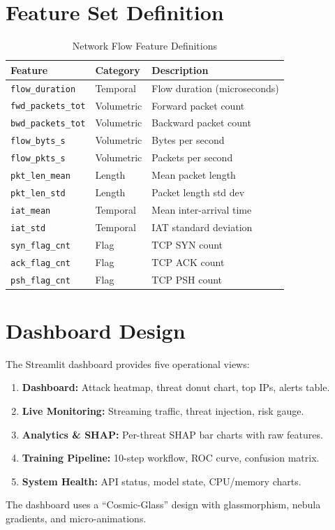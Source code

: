 \section{Feature Set Definition}

\begin{table}[H]
\centering
\caption{Network Flow Feature Definitions}
\label{tab:features}
\begin{tabular}{l l p{5.5cm}}
\toprule
\textbf{Feature} & \textbf{Category} & \textbf{Description} \\
\midrule
\texttt{flow\_duration} & Temporal & Flow duration (microseconds) \\
\texttt{fwd\_packets\_tot} & Volumetric & Forward packet count \\
\texttt{bwd\_packets\_tot} & Volumetric & Backward packet count \\
\texttt{flow\_byts\_s} & Volumetric & Bytes per second \\
\texttt{flow\_pkts\_s} & Volumetric & Packets per second \\
\texttt{pkt\_len\_mean} & Length & Mean packet length \\
\texttt{pkt\_len\_std} & Length & Packet length std dev \\
\texttt{iat\_mean} & Temporal & Mean inter-arrival time \\
\texttt{iat\_std} & Temporal & IAT standard deviation \\
\texttt{syn\_flag\_cnt} & Flag & TCP SYN count \\
\texttt{ack\_flag\_cnt} & Flag & TCP ACK count \\
\texttt{psh\_flag\_cnt} & Flag & TCP PSH count \\
\bottomrule
\end{tabular}
\end{table}

\section{Dashboard Design}

The Streamlit dashboard provides five operational views:
\begin{enumerate}
    \item \textbf{Dashboard:} Attack heatmap, threat donut chart, top IPs, alerts table.
    \item \textbf{Live Monitoring:} Streaming traffic, threat injection, risk gauge.
    \item \textbf{Analytics \& SHAP:} Per-threat SHAP bar charts with raw features.
    \item \textbf{Training Pipeline:} 10-step workflow, ROC curve, confusion matrix.
    \item \textbf{System Health:} API status, model state, CPU/memory charts.
\end{enumerate}

The dashboard uses a ``Cosmic-Glass'' design with glassmorphism, nebula gradients, and micro-animations.
